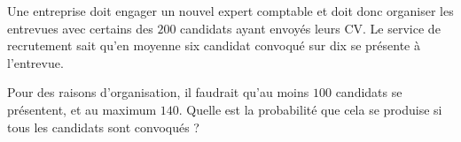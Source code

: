 
\begin{exercice}\label{exosmath-0431}

    Une entreprise doit engager un nouvel expert comptable et doit donc organiser les entrevues avec certains des \( 200\) candidats ayant envoyés leurs CV. Le service de recrutement sait qu'en moyenne six candidat convoqué sur dix se présente à l'entrevue.

    Pour des raisons d'organisation, il faudrait qu'au moins $100$ candidats se présentent, et au maximum $140$. Quelle est la probabilité que cela se produise si tous les candidats sont convoqués ?

\end{exercice}
